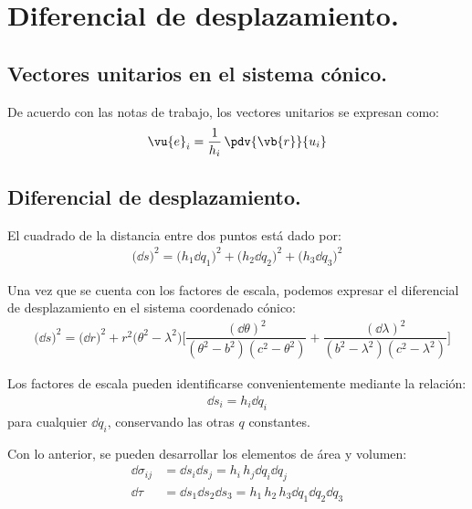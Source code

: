 \section{Diferencial de desplazamiento.}
\subsection{Vectores unitarios en el sistema cónico.}

De acuerdo con las notas de trabajo, los vectores unitarios se expresan como:
\begin{align*}
\vu{e}_{i} = \dfrac{1}{h_{i}} \, \pdv{\vb{r}}{u_{i}}
\end{align*}

\subsection{Diferencial de desplazamiento.}

El cuadrado de la distancia entre dos puntos está dado por:
\begin{align*}
\big( \dd{s} \big)^{2} = \big( h_{1} \dd{q_{1}} \big)^{2} + \big( h_{2} \dd{q_{2}} \big)^{2} + \big( h_{3} \dd{q_{3}} \big)^{2}
\end{align*}

Una vez que se cuenta con los factores de escala, podemos expresar el diferencial de desplazamiento en el sistema coordenado cónico:
\begin{align*}
&\big( \dd{s} \big)^{2} = \big( \dd{r} \big)^{2} + r^{2} \big( \theta^{2} {-} \lambda^{2} \big) \bigg[ \dfrac{(\dd{\theta})^{2}}{(\theta^{2} {-} b^{2})(c^{2} {-} \theta^{2})} {+} \dfrac{(\dd{\lambda})^{2}}{(b^{2} {-} \lambda^{2})(c^{2} {-} \lambda^{2})} \bigg]
\end{align*}

Los factores de escala pueden identificarse convenientemente mediante la relación:
\begin{align*}
\dd{s_{i}} = h_{i} \dd{q_{i}}
\end{align*}
para cualquier $\dd{q_{i}}$, conservando las otras $q$ constantes.
\par
Con lo anterior, se pueden desarrollar los elementos de área y volumen:
\begin{align*}
\dd{\sigma_{ij}} &= \dd{s_{i}} \dd{s_{j}} = h_{i} \, h_{j} \dd{q_{i}} \dd{q_{j}} \\[0.5em] 
\dd{\tau} &= \dd{s_{1}} \dd{s_{2}} \dd{s_{3}}= h_{1} \, h_{2} \, h_{3} \dd{q_{1}} \dd{q_{2}} \dd{q_{3}}
\end{align*}
